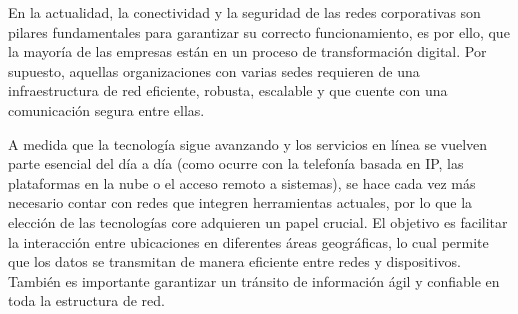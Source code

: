 En la actualidad, la conectividad y la seguridad de las redes corporativas son pilares fundamentales para garantizar su correcto funcionamiento, es por ello, que la mayoría de las empresas están en un proceso de transformación digital. Por supuesto, aquellas organizaciones con varias sedes requieren de una infraestructura de red eficiente, robusta, escalable y que cuente con una comunicación segura entre ellas.

\vspace{0.5cm}
A medida que la tecnología sigue avanzando y los servicios en línea se vuelven parte esencial del día a día (como ocurre con la telefonía basada en IP, las plataformas en la nube o el acceso remoto a sistemas), se hace cada vez más necesario contar con redes que integren herramientas actuales, por lo que la elección de las tecnologías core adquieren un papel crucial. El objetivo es facilitar la interacción entre ubicaciones en diferentes áreas geográficas, lo cual permite que los datos se transmitan de manera eficiente entre redes y dispositivos. También es 
importante garantizar un tránsito de información ágil y confiable en toda la estructura de red.

